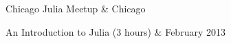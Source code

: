 \documentclass[letterpaper]{article}
\begin{document}
\begin{list1}
  \item
  \begin{tabular1bold}
   Chicago Julia Meetup  & Chicago\\
  \end{tabular1bold}
  \begin{tabular2}
   An Introduction to Julia (3 hours) & February 2013 \\
  \end{tabular2}


\end{list1}
\end{document}
